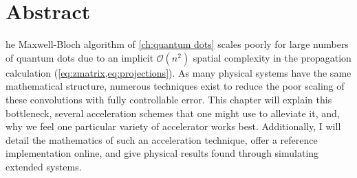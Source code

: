 \section{Abstract}

he Maxwell-Bloch algorithm of \cref{ch:quantum dots} scales poorly for large numbers of quantum dots due to an implicit $\mathcal{O}(n^2)$ spatial complexity in the propagation calculation (\cref{eq:zmatrix,eq:projections}).
As many physical systems have the same mathematical structure, numerous techniques exist to reduce the poor scaling of these convolutions with fully controllable error.
This chapter will explain this bottleneck, several acceleration schemes that one might use to alleviate it, and, why we feel one particular variety of accelerator works best.
Additionally, I will detail the mathematics of such an acceleration technique, offer a reference implementation online, and give physical results found through simulating extended systems.
